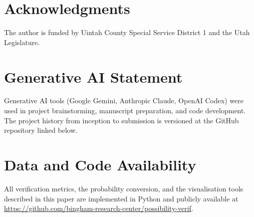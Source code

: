
\section*{Acknowledgments}\label{sec:acknowledgments}
The author is funded by Uintah County Special
Service District 1 and the Utah Legislature.


\section*{Generative AI Statement}\label{sec:genai_statement}

Generative AI tools (Google Gemini, Anthropic Claude,
OpenAI Codex) were used in project brainstorming,
manuscript preparation, and code development.
The project history from inception to submission
is versioned at the GitHub repository linked below.

\section*{Data and Code Availability}\label{sec:data_code}

All verification metrics, the probability conversion, and the visualisation
tools described in this paper are implemented in Python and publicly
available at
\url{https://github.com/bingham-research-center/possibility-verif}.


